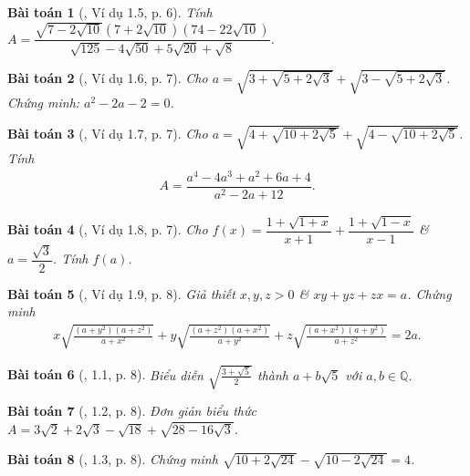 \documentclass{article}
\newtheorem{baitoan}{Bài toán}
\begin{document}
\begin{baitoan}[\cite{TLCT_THCS_Toan_9_dai_so}, Ví dụ 1.5, p. 6]
	Tính $A = \dfrac{\sqrt{7 - 2\sqrt{10}}(7 + 2\sqrt{10})(74 - 22\sqrt{10})}{\sqrt{125} - 4\sqrt{50} + 5\sqrt{20} + \sqrt{8}}$.
\end{baitoan}

\begin{baitoan}[\cite{TLCT_THCS_Toan_9_dai_so}, Ví dụ 1.6, p. 7]
	Cho $a = \sqrt{3 + \sqrt{5 + 2\sqrt{3}}} + \sqrt{3 - \sqrt{5 + 2\sqrt{3}}}$. Chứng minh: $a^2 - 2a - 2 = 0$.
\end{baitoan}

\begin{baitoan}[\cite{TLCT_THCS_Toan_9_dai_so}, Ví dụ 1.7, p. 7]
	Cho $a = \sqrt{4 + \sqrt{10 + 2\sqrt{5}}} + \sqrt{4 - \sqrt{10 + 2\sqrt{5}}}$. Tính
	\begin{align*}
		A = \dfrac{a^4 - 4a^3 + a^2 + 6a + 4}{a^2 - 2a + 12}.
	\end{align*}
\end{baitoan}

\begin{baitoan}[\cite{TLCT_THCS_Toan_9_dai_so}, Ví dụ 1.8, p. 7]
	Cho $f(x) = \dfrac{1 + \sqrt{1 + x}}{x + 1} + \dfrac{1 + \sqrt{1 - x}}{x - 1}$ \& $a = \dfrac{\sqrt{3}}{2}$. Tính $f(a)$.
\end{baitoan}

\begin{baitoan}[\cite{TLCT_THCS_Toan_9_dai_so}, Ví dụ 1.9, p. 8]
	Giả thiết $x,y,z > 0$ \& $xy + yz + zx = a$. Chứng minh
	\begin{align*}
		x\sqrt{\frac{(a + y^2)(a + z^2)}{a + x^2}} + y\sqrt{\frac{(a + z^2)(a + x^2)}{a + y^2}} + z\sqrt{\frac{(a + x^2)(a + y^2)}{a + z^2}} = 2a.
	\end{align*}
\end{baitoan}

\begin{baitoan}[\cite{TLCT_THCS_Toan_9_dai_so}, 1.1, p. 8]
	Biểu diễn $\sqrt{\frac{3 + \sqrt{5}}{2}}$ thành $a + b\sqrt{5}$ với $a,b\in\mathbb{Q}$.
\end{baitoan}

\begin{baitoan}[\cite{TLCT_THCS_Toan_9_dai_so}, 1.2, p. 8]
	Đơn giản biểu thức $A = 3\sqrt{2} + 2\sqrt{3} - \sqrt{18} + \sqrt{28 - 16\sqrt{3}}$.
\end{baitoan}

\begin{baitoan}[\cite{TLCT_THCS_Toan_9_dai_so}, 1.3, p. 8]
	Chứng minh $\sqrt{10 + 2\sqrt{24}} - \sqrt{10 - 2\sqrt{24}} = 4$.
\end{baitoan}
\end{document}
